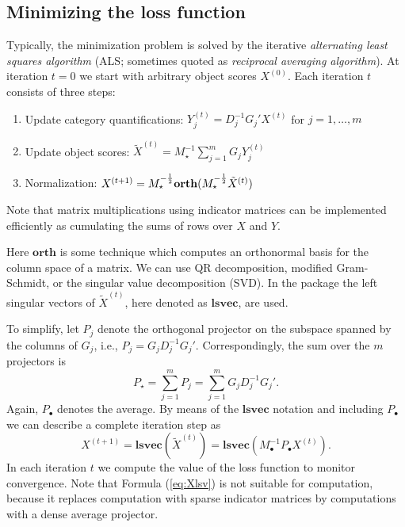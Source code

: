 \documentclass[article, nojss]{jss}
\begin{document}
\subsection{Minimizing the loss function}
Typically, the minimization problem is solved by the iterative \emph{alternating least squares algorithm} (ALS; sometimes quoted as \emph{reciprocal averaging algorithm}). At iteration $t=0$ we start with arbitrary object scores $X^{(0)}$. Each iteration $t$ consists of three steps:
\begin{enumerate}
\item Update category quantifications: $Y_j^{(t)}=D_j^{-1}G_j'X^{(t)}$ for $j=1,\ldots,m$
\item Update object scores: $\tilde X^{(t)}=M_\star^{-1}\sum_{j=1}^m G_j^{}Y_j^{(t)}$
\item Normalization: $X^{(t+1)}=M_\star^{-\frac12}{\bf orth}(M_\star^{-\frac12}\tilde X^{(t)})$
\end{enumerate}
Note that matrix multiplications using indicator matrices can be implemented efficiently as cumulating the sums of rows over $X$ and $Y$. 

Here $\mathbf{orth}$ is some technique which computes an orthonormal basis for the column space of a matrix. We can use QR decomposition, modified Gram-Schmidt, or the singular value decomposition (SVD). In the  package the left singular vectors of $\tilde X^{(t)}$, here denoted as $\mathbf{lsvec}$, are used. 

To simplify, let $P_j$ denote the orthogonal projector on the subspace spanned by the columns of $G_j$, i.e.,
$P_j^{}=G_j^{}D_j^{-1}G_j'$. Correspondingly, the sum over the $m$ projectors is 
\begin{equation}
P_\star=\sum_{j=1}^m P_j = \sum_{j=1}^m G_j^{}D_j^{-1}G_j'.
\end{equation}
Again, $P_\bullet$ denotes the average. By means of the $\mathbf{lsvec}$ notation and including $P_\bullet$ we can describe a complete iteration step as 
\begin{equation}
\label{eq:Xlsv}
X^{(t+1)}=\mathbf{lsvec}(\tilde X^{(t)})=\mathbf{lsvec}(M_\bullet^{-1}P_\bullet^{} X^{(t)}).
\end{equation}
In each iteration $t$ we compute the value of the loss function to monitor convergence. Note that Formula (\ref{eq:Xlsv}) is not suitable for computation, because it replaces computation with sparse indicator matrices by computations with a dense average projector. 
\end{document}

